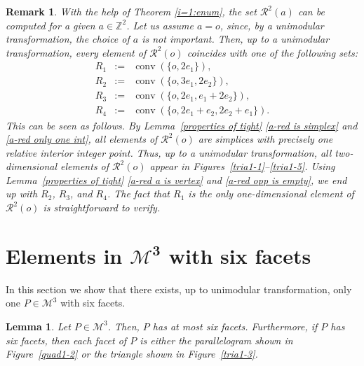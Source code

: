 \documentclass[a4paper]{article}
\theoremstyle{plain}
\newtheorem{lemma}[nn]{Lemma}
\newtheorem{remark}[nn]{Remark}
\begin{document}
\begin{remark} \label{R^2(0)}
With the help of Theorem \ref{i=1:enum}, the set ${\mathcal{R}}^2(a)$
can be computed for a given $a \in {\mathbb{Z}}^2$.
Let us assume $a = o$, since, by a unimodular
transformation, the choice of $a$ is not important.
Then, up to a unimodular transformation, every element of
${\mathcal{R}}^2(o)$ coincides with one of the following sets:
\begin{eqnarray*}
  R_1 & := & {{\mathop{\mathrm{{conv}}}}}(\{o,2 e_1\}), \\
  R_2 & := & {{\mathop{\mathrm{{conv}}}}}(\{o, 3 e_1, 2 e_2\}), \\
  R_3 & := & {{\mathop{\mathrm{{conv}}}}}(\{o, 2 e_1, e_1 + 2 e_2\}), \\
  R_4 & := & {{\mathop{\mathrm{{conv}}}}}(\{o,2 e_1 + e_2, 2 e_2 + e_1\}).
\end{eqnarray*}
This can be seen as follows.
By Lemma~\ref{properties of tight} \ref{a-red is simplex} 
and \ref{a-red only one int}, all elements of ${\mathcal{R}}^2(o)$ are
simplices with precisely one relative interior integer
point.
Thus, up to a unimodular transformation, all two-dimensional
elements of ${\mathcal{R}}^2(o)$ appear in
Figures~\ref{tria1-1}--\ref{tria1-5}.
Using Lemma~\ref{properties of tight}
\ref{a-red a is vertex} and \ref{a-red opp is empty}, we
end up with $R_2$, $R_3$, and $R_4$.
The fact that $R_1$ is the only one-dimensional element of
${\mathcal{R}}^2(o)$ is straightforward to verify.
\end{remark}

\section{Elements in $\boldsymbol{\mathcal{M}^3}$ with six facets} \label{parity}

In this section we show that there exists, up to unimodular
transformation, only one $P \in {\mathcal{M}^3}$ with six facets.

\begin{lemma} \label{6.facet.lemma}
Let $P \in {\mathcal{M}^3}$.
Then, $P$ has at most six facets.
Furthermore, if $P$ has six facets, then each facet of $P$
is either the parallelogram shown in Figure~\ref{quad1-2} or
the triangle shown in Figure~\ref{tria1-3}.
\end{lemma}
\end{document}
